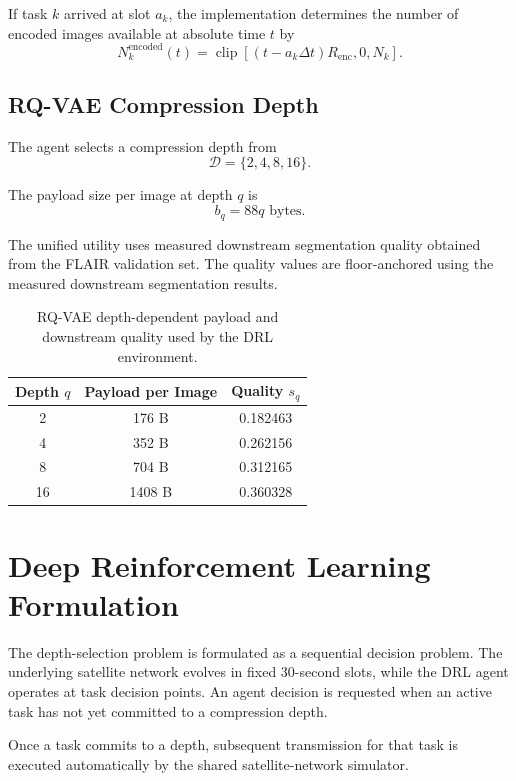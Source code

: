 \documentclass[11pt]{article}
\begin{document}
If task $k$ arrived at slot $a_k$, the implementation determines the number
of encoded images available at absolute time $t$ by
\[
N_k^{\mathrm{encoded}}(t)
=
\operatorname{clip}
\left[
(t-a_k\Delta t)R_{\mathrm{enc}},
0,
N_k
\right].
\]


\subsection{RQ-VAE Compression Depth}

The agent selects a compression depth from
\[
\mathcal{D}=\{2,4,8,16\}.
\]

The payload size per image at depth $q$ is
\[
b_q=88q\text{ bytes}.
\]

The unified utility uses measured downstream segmentation quality obtained
from the FLAIR validation set. The quality values are floor-anchored using
the measured downstream segmentation results.

\begin{table}[h]
\centering
\begin{tabular}{ccc}
\toprule
Depth $q$ & Payload per Image & Quality $s_q$ \\
\midrule
2  & 176 B  & 0.182463 \\
4  & 352 B  & 0.262156 \\
8  & 704 B  & 0.312165 \\
16 & 1408 B & 0.360328 \\
\bottomrule
\end{tabular}
\caption{RQ-VAE depth-dependent payload and downstream quality used by the
DRL environment.}
\label{tab:depths}
\end{table}


\section{Deep Reinforcement Learning Formulation}

The depth-selection problem is formulated as a sequential decision problem.
The underlying satellite network evolves in fixed 30-second slots, while the
DRL agent operates at task decision points. An agent decision is requested
when an active task has not yet committed to a compression depth.

Once a task commits to a depth, subsequent transmission for that task is
executed automatically by the shared satellite-network simulator.
\end{document}
